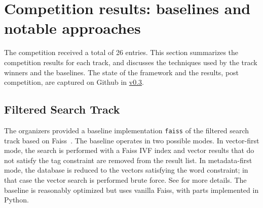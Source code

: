 \section{Competition results: baselines and notable approaches}
\label{sec:results}

The competition received a total of 26 entries.
%
This section summarizes the competition results for each track,
and discusses the techniques used by the track winners and the baselines.
%
The state of the framework and the results, post competition, are captured on Github in 
\href{https://github.com/harsha-simhadri/big-ann-benchmarks/releases/tag/v0.3.0}{v0.3}.

\subsection{Filtered Search Track}

The organizers provided a baseline implementation \texttt{faiss} of the filtered search track based on Faiss~\cite{douze2024faiss}. 
The baseline operates in two possible modes. 
In vector-first mode, the search is performed with a Faiss IVF index and vector results that do not satisfy the tag constraint are removed from the result list. 
In metadata-first mode, the database is reduced to the vectors satisfying the word constraint; in that case the vector search is performed brute force. 
See \cite[Section 6.2]{douze2024faiss} for more details. 
The baseline is reasonably optimized but uses vanilla Faiss, with parts implemented in Python. 


